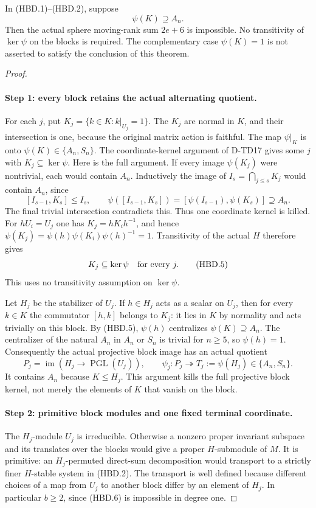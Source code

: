 \begin{theorem}[D-TD42]
In (HBD.1)--(HBD.2), suppose
\[
                             \psi(K)\supseteq A_n.
 \tag{HBD.3}
\]
Then the actual sphere moving-rank sum $2e+6$ is impossible.
No transitivity of $\ker\psi$ on the blocks is required.
The complementary case $\psi(K)=1$ is not asserted to satisfy
the conclusion of this theorem.
\end{theorem}

\begin{proof}
\paragraph{Step 1: every block retains the actual alternating quotient.}
For each $j$, put
$K_j=\{k\in K:k|_{U_j}=1\}$.  The $K_j$ are normal in $K$,
and their intersection is one, because the original matrix
action is faithful.  The map $\psi|_K$ is onto
$\psi(K)\in\{A_n,S_n\}$.  The coordinate-kernel argument
of D-TD17 gives some $j$ with $K_j\subseteq\ker\psi$.
Here is the full argument.  If every image $\psi(K_j)$ were
nontrivial, each would contain $A_n$.  Inductively the image of
$I_s=\bigcap_{j\le s}K_j$ would contain $A_n$, since
\[
 [I_{s-1},K_s]\le I_s,\qquad
 \psi([I_{s-1},K_s])
        =[\psi(I_{s-1}),\psi(K_s)]\supseteq A_n.
 \tag{HBD.4}
\]
The final trivial intersection contradicts this.  Thus one
coordinate kernel is killed.  For $hU_i=U_j$ one has
$K_j=hK_ih^{-1}$, and hence
$\psi(K_j)=\psi(h)\psi(K_i)\psi(h)^{-1}=1$.
Transitivity of the actual $H$ therefore gives
\[
                         K_j\subseteq\ker\psi
                              \quad\hbox{for every }j.
 \tag{HBD.5}
\]
This uses no transitivity assumption on $\ker\psi$.

Let $H_j$ be the stabilizer of $U_j$.  If $h\in H_j$ acts
as a scalar on $U_j$, then for every $k\in K$ the commutator
$[h,k]$ belongs to $K_j$: it lies in $K$ by normality and acts
trivially on this block.  By (HBD.5), $\psi(h)$ centralizes
$\psi(K)\supseteq A_n$.  The centralizer of the natural
$A_n$ in $A_n$ or $S_n$ is trivial for $n\ge5$, so
$\psi(h)=1$.  Consequently the actual projective block image
has an actual quotient
\[
 P_j=\operatorname{im}(H_j\to\operatorname{PGL}(U_j)),\qquad
 \psi_j:P_j\twoheadrightarrow T_j:=\psi(H_j)\in\{A_n,S_n\}.
 \tag{HBD.6}
\]
It contains $A_n$ because $K\le H_j$.  This argument kills
the full projective block kernel, not merely the elements of
$K$ that vanish on the block.

\paragraph{Step 2: primitive block modules and one fixed terminal coordinate.}
The $H_j$-module $U_j$ is irreducible.  Otherwise a nonzero
proper invariant subspace and its translates over the blocks
would give a proper $H$-submodule of $M$.
It is primitive: an $H_j$-permuted direct-sum decomposition
would transport to a strictly finer $H$-stable system in (HBD.2).
The transport is well defined because different choices of a
map from $U_j$ to another block differ by an element of $H_j$.
In particular $b\ge2$, since (HBD.6) is impossible in degree one.


\end{proof}
